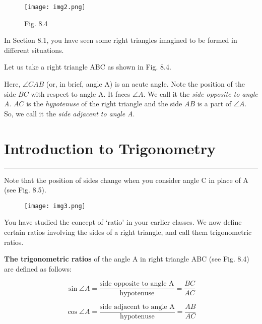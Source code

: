 \documentclass[11pt,a4paper]{article}
\begin{document}
\begin{wrapfigure}{r}{0.4\textwidth}
  \centering
  \vspace{-1.5em}
  \texttt{[image: img2.png]}
  \caption*{\small Fig. 8.4}
\end{wrapfigure}

In Section 8.1, you have seen some right triangles imagined to be formed in different situations.

Let us take a right triangle ABC as shown in Fig. 8.4.

Here, $\angle CAB$ (or, in brief, angle A) is an acute angle. Note the position of the side $BC$ with respect to angle A. It faces $\angle A$. We call it the \textit{side opposite to angle A}. $AC$ is the \textit{hypotenuse} of the right triangle and the side $AB$ is a part of $\angle A$. So, we call it the \textit{side adjacent to angle A}.



\vspace{10em}
\section*{Introduction to Trigonometry}
\vspace{-0.2cm}
\noindent\textcolor{cyan}{\rule{\textwidth}{1pt}}

\vspace{0.3cm}


  

\noindent
Note that the position of sides change when you consider angle C in place of A (see Fig. 8.5).
\begin{wrapfigure}
{r}{0.4\textwidth}
\texttt{[image: img3.png]} 
\label{fig:wrapfig}
\end{wrapfigure}


You have studied the concept of ‘ratio’ in your earlier classes. We now define certain ratios involving the sides of a right triangle, and call them trigonometric ratios.

\textbf{The trigonometric ratios} of the angle A in right triangle ABC (see Fig. 8.4) are defined as follows:

\[
\sin \angle A = \frac{\text{side opposite to angle A}}{\text{hypotenuse}} = \frac{BC}{AC}
\]

\[
\cos \angle A = \frac{\text{side adjacent to angle A}}{\text{hypotenuse}} = \frac{AB}{AC}
\]
\end{document}
